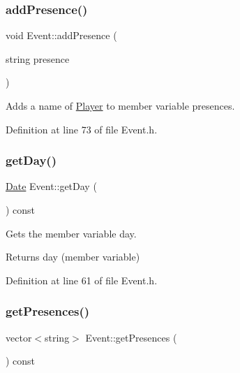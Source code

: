 \subsubsection{\texorpdfstring{add\+Presence()}{addPresence()}}
{\footnotesize\ttfamily void Event\+::add\+Presence (\begin{DoxyParamCaption}\item[{string}]{presence }\end{DoxyParamCaption})\hspace{0.3cm}{\ttfamily [inline]}}



Adds a name of \hyperlink{class_player}{Player} to member variable presences. 



Definition at line 73 of file Event.\+h.

\hypertarget{class_event_a9c016f59ee7116b2397a4823911e1a65}{}\label{class_event_a9c016f59ee7116b2397a4823911e1a65} 
\subsubsection{\texorpdfstring{get\+Day()}{getDay()}}
{\footnotesize\ttfamily \hyperlink{class_date}{Date} Event\+::get\+Day (\begin{DoxyParamCaption}{ }\end{DoxyParamCaption}) const\hspace{0.3cm}{\ttfamily [inline]}}



Gets the member variable day. 

\begin{DoxyReturn}{Returns}
day (member variable) 
\end{DoxyReturn}


Definition at line 61 of file Event.\+h.

\hypertarget{class_event_a67677233149ff7e2ebe038d3cfa35223}{}\label{class_event_a67677233149ff7e2ebe038d3cfa35223} 
\subsubsection{\texorpdfstring{get\+Presences()}{getPresences()}}
{\footnotesize\ttfamily vector$<$string$>$ Event\+::get\+Presences (\begin{DoxyParamCaption}{ }\end{DoxyParamCaption}) const\hspace{0.3cm}{\ttfamily [inline]}}



